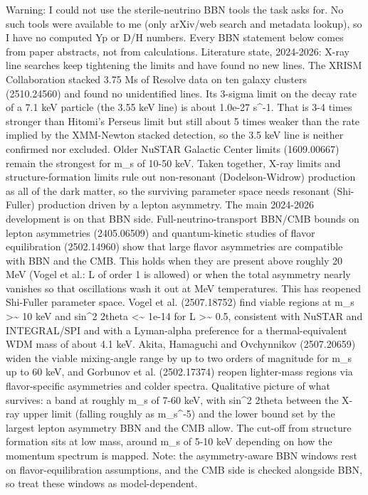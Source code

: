 \documentclass[11pt,a4paper]{article}
\begin{document}
Warning: I could not use the sterile-neutrino BBN tools the task asks for. No such tools were available to me (only arXiv/web search and metadata lookup), so I have no computed Yp or D/H numbers. Every BBN statement below comes from paper abstracts, not from calculations. Literature state, 2024-2026: X-ray line searches keep tightening the limits and have found no new lines. The XRISM Collaboration stacked 3.75 Ms of Resolve data on ten galaxy clusters (2510.24560) and found no unidentified lines. Its 3-sigma limit on the decay rate of a 7.1 keV particle (the 3.55 keV line) is about 1.0e-27 s\textasciicircum{}-1. That is 3-4 times stronger than Hitomi's Perseus limit but still about 5 times weaker than the rate implied by the XMM-Newton stacked detection, so the 3.5 keV line is neither confirmed nor excluded. Older NuSTAR Galactic Center limits (1609.00667) remain the strongest for m\_s of 10-50 keV. Taken together, X-ray limits and structure-formation limits rule out non-resonant (Dodelson-Widrow) production as all of the dark matter, so the surviving parameter space needs resonant (Shi-Fuller) production driven by a lepton asymmetry. The main 2024-2026 development is on that BBN side. Full-neutrino-transport BBN/CMB bounds on lepton asymmetries (2405.06509) and quantum-kinetic studies of flavor equilibration (2502.14960) show that large flavor asymmetries are compatible with BBN and the CMB. This holds when they are present above roughly 20 MeV (Vogel et al.: L of order 1 is allowed) or when the total asymmetry nearly vanishes so that oscillations wash it out at MeV temperatures. This has reopened Shi-Fuller parameter space. Vogel et al. (2507.18752) find viable regions at m\_s \textgreater{}\textasciitilde{} 10 keV and sin\textasciicircum{}2 2theta \textless{}\textasciitilde{} 1e-14 for L \textgreater{}\textasciitilde{} 0.5, consistent with NuSTAR and INTEGRAL/SPI and with a Lyman-alpha preference for a thermal-equivalent WDM mass of about 4.1 keV. Akita, Hamaguchi and Ovchynnikov (2507.20659) widen the viable mixing-angle range by up to two orders of magnitude for m\_s up to 60 keV, and Gorbunov et al. (2502.17374) reopen lighter-mass regions via flavor-specific asymmetries and colder spectra. Qualitative picture of what survives: a band at roughly m\_s of 7-60 keV, with sin\textasciicircum{}2 2theta between the X-ray upper limit (falling roughly as m\_s\textasciicircum{}-5) and the lower bound set by the largest lepton asymmetry BBN and the CMB allow. The cut-off from structure formation sits at low mass, around m\_s of 5-10 keV depending on how the momentum spectrum is mapped. Note: the asymmetry-aware BBN windows rest on flavor-equilibration assumptions, and the CMB side is checked alongside BBN, so treat these windows as model-dependent.
\end{document}
